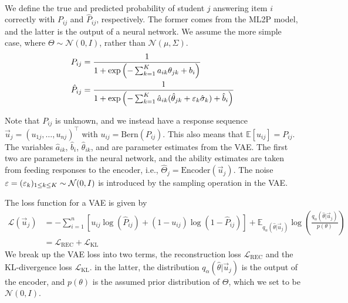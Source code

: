 \documentclass[letterpaper]{article}
\def \e{\ensuremath \varepsilon}
\theoremstyle{definition}
\begin{document}
\\
We define the true and predicted probability of student $j$ answering item $i$ correctly with $P_{ij}$ and $\hat P_{ij}$, respectively. The former comes from the ML2P model, and the latter is the output of a neural network. We assume the more simple case, where $\Theta \sim \mathcal{N}(0,I)$, rather than $\mathcal{N}(\mu, \Sigma)$.
\begin{equation}
  \begin{split}
  P_{ij} &= \frac{1}{1 + \exp\left(-\sum_{k=1}^K a_{ik}\theta_{jk} + b_i\right)}\\
  \label{eq:ml2p}
  \hat P_{ij} &= \frac{1}{1 + \exp\left(-\sum_{k=1}^K \hat a_{ik} (\hat \theta_{jk} + \e_k \hat \sigma_k) + \hat b_i\right)} 
\end{split}
    \label{eq:vae_out}
\end{equation}

Note that $P_{ij}$ is unknown, and we instead have a response sequence $\vec u_j = (u_{1j},\ldots, u_{nj})^\top$ with $u_{ij} = \text{Bern}(P_{ij})$. This also means that $\mathbb{E}[u_{ij}] = P_{ij}$. The variables $\hat a_{ik}$, $\hat b_i$, $\hat \theta_{ik}$, and are parameter estimates from the VAE. The first two are parameters in the neural network, and the ability estimates are taken from feeding responses to the encoder, i.e., $\hat \Theta_j = \text{Encoder}(\vec u_j)$. The noise $\e = (\e_k)_{1\leq k \leq K} \sim \mathcal{N}(0,I)$ is introduced by the sampling operation in the VAE.

The loss function for a VAE is given by 
\begin{equation}
  \begin{split}
  \mathcal{L}(\vec u_j) &= -\sum_{i=1}^n \left[u_{ij} \log(\hat P_{ij}) + (1-u_{ij})\log(1 - \hat P_{ij})\right] + \mathbb{E}_{q_\alpha(\hat \theta | \vec u_j)}\log\left( \frac{q_{\alpha}(\hat \theta |\vec u_j)}{p(\theta)}\right) \\
    &= \mathcal{L}_{\text{REC}} + \mathcal{L}_{\text{KL}}
  \end{split}
  \label{eq:vae_loss}
\end{equation}
We break up the VAE loss into two terms, the reconstruction loss $\mathcal{L}_{\text{REC}}$ and the KL-divergence loss $\mathcal{L}_{\text{KL}}$. in the latter, the distribution $q_\alpha(\hat \theta | \vec u_j)$ is the output of the encoder, and $p(\theta)$ is the assumed prior distribution of $\Theta$, which we set to be $\mathcal{N}(0,I)$.
\end{document}
